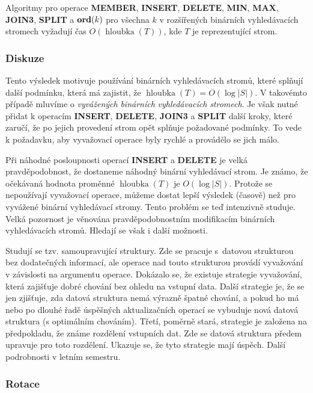 \documentclass[a4paper,12pt]{article}
\DeclareMathOperator*{\hloubka}{hloubka}
\begin{document}
\begin{veta}Algoritmy pro operace {\bf MEMBER}, {\bf INSERT}, {\bf DE\-LE\-TE}, {\bf MIN}, {\bf MAX}, 
{\bf JOIN3}, {\bf SPLIT} a $\bold o\bold r\bold d(k)$ pro všechna $
k$ v rozšířených binár\-ních 
vy\-hledávacích stromech vyžadují čas $O(\hloubka
(T))$, kde $T$ je 
reprezentující strom. 
\end{veta}

\subsubsection{Diskuze}

Tento výsledek motivuje používání binárních 
vyhledávacích stromů, které splňují další 
podmínku, která má zajistit, že 
$\hloubka(T)=O(\log|S|)$.  V takovémto případě mluvíme o 
\emph{vyvážených} \emph{binárních} 
\emph{vyhledávacích} \emph{stromech}.  Je však nutné 
přidat k ope\-racím {\bf INSERT}, {\bf DELETE}, {\bf JOIN3} a {\bf SPLIT} další 
kroky, které 
zaručí, že po jejich provedení strom opět splňuje 
požadované podmínky.  To vede k požadavku, aby 
vyvažovací operace byly rychlé a provádělo se jich málo.  

Při náhodné posloupnosti operací {\bf INSERT} a {\bf DELETE} je 
velká pravděpodobnost, že dostaneme náhodný binární 
vy\-hledávací strom.  Je známo, že očekávaná hodnota proměn\-né 
$\hloubka(T)$ je $O(\log|S|)$.  Protože se nepoužívají vyvažovací 
operace, můžeme dostat lepší výsledek (časově) než pro 
vyvá\-žené binár\-ní vyhledávací stromy.  Tento problém se teď 
intenzivně studu\-je.  Velká pozornost je věnována 
pravděpodobnost\-ním modifikacím binárních vyhledávacích 
stromů.  Hledají se však i další možnosti.  

Studují se tzv.  samoupravující struktury.  Zde se 
pracuje s~datovou strukturou bez dodatečných informací, ale 
operace nad touto strukturou provádí vyvažování v závislosti 
na argumentu operace.  Dokázalo se, že existuje strategie 
vyvažování, která zajišťuje dobré chování bez ohledu na 
vstupní data.  Další strategie je, že se jen zjišťuje, zda datová 
struktura nemá výraz\-ně špatné chování, a pokud ho má nebo 
po dlouhé řadě úspěš\-ných aktualizačních operací se vybuduje 
nová datová struktura (s optimálním chováním).  Třetí, 
poměrně stará, strategie je zalo\-že\-na na předpokladu, že 
známe rozdělení vstupních dat.  Zde se datová struktura 
předem upravuje pro toto rozdělení.  Ukazuje se, že tyto 
strategie mají úspěch.  Další podrobnosti v letním semestru.  

\subsubsection{Rotace}
\end{document}
